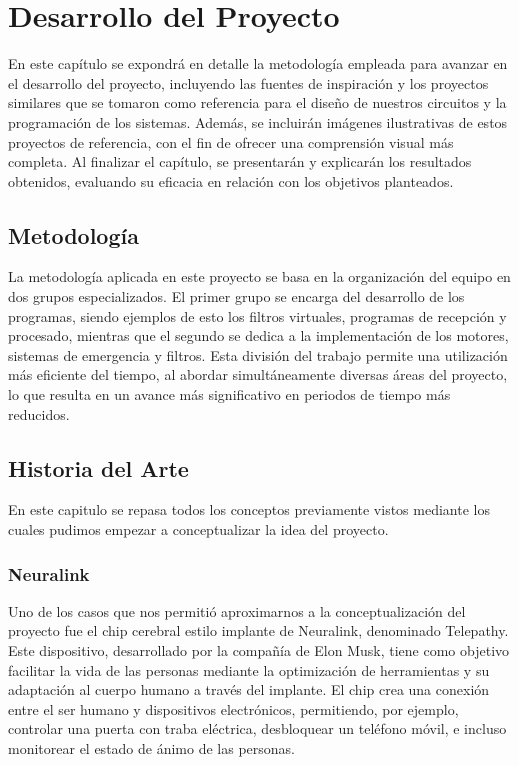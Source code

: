 \documentclass{article}
\begin{document}
\section{Desarrollo del Proyecto}
En este capítulo se expondrá en detalle la metodología empleada para avanzar en el desarrollo del proyecto, incluyendo las fuentes de inspiración y los proyectos similares que se tomaron como referencia para el diseño de nuestros circuitos y la programación de los sistemas. Además, se incluirán imágenes ilustrativas de estos proyectos de referencia, con el fin de ofrecer una comprensión visual más completa. Al finalizar el capítulo, se presentarán y explicarán los resultados obtenidos, evaluando su eficacia en relación con los objetivos planteados.

\subsection{Metodología}
La metodología aplicada en este proyecto se basa en la organización del equipo en dos grupos especializados. El primer grupo se encarga del desarrollo de los programas, siendo ejemplos de esto los filtros virtuales, programas de recepción y procesado, mientras que el segundo se dedica a la implementación de los motores, sistemas de emergencia y filtros. Esta división del trabajo permite una utilización más eficiente del tiempo, al abordar simultáneamente diversas áreas del proyecto, lo que resulta en un avance más significativo en periodos de tiempo más reducidos.


\subsection{Historia del Arte}
En este capitulo se repasa todos los conceptos previamente vistos mediante los cuales pudimos empezar a conceptualizar la idea del proyecto.

\subsubsection{Neuralink}
Uno de los casos que nos permitió aproximarnos a la conceptualización del proyecto fue el chip cerebral estilo implante de Neuralink, denominado Telepathy. Este dispositivo, desarrollado por la compañía de Elon Musk, tiene como objetivo facilitar la vida de las personas mediante la optimización de herramientas y su adaptación al cuerpo humano a través del implante. El chip crea una conexión entre el ser humano y dispositivos electrónicos, permitiendo, por ejemplo, controlar una puerta con traba eléctrica, desbloquear un teléfono móvil, e incluso monitorear el estado de ánimo de las personas.
\end{document}
